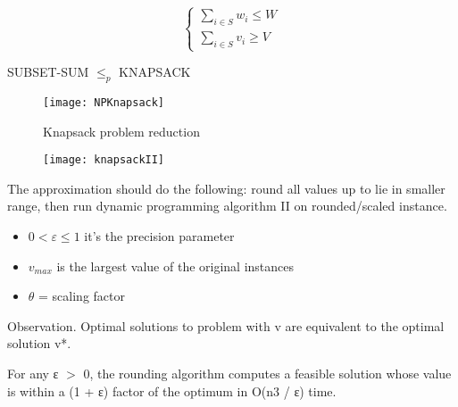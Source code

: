 \[\begin{cases} \sum_{i \in S} w_{i} \leq W \\  \sum_{i \in S} v_{i} \geq V \end{cases}\]

\begin{claim}
    SUBSET-SUM $\leq _{p}$ KNAPSACK
\end{claim}

\begin{figure}[H]
    \centering
    \texttt{[image: NPKnapsack]}
    \caption{Knapsack problem reduction}
\end{figure}

\begin{figure}[H]
    \centering
    \texttt{[image: knapsackII]}

\end{figure}
The approximation should do the following: round all values up to lie in smaller range, then run dynamic programming algorithm II on rounded/scaled instance.

\begin{itemize}
    \item{$0<ε\leq1$ it's the precision parameter}
    \item{$v_{max}$ is the largest value of the original instances}
    \item{$\theta$ = scaling factor }
\end{itemize}

Observation. Optimal solutions to problem with v are equivalent to the optimal solution v*.

For any ε $>$ 0, the rounding algorithm computes a feasible solution whose value is within a (1 + ε) factor of the optimum in O(n3 / ε) time.

\clearpage
